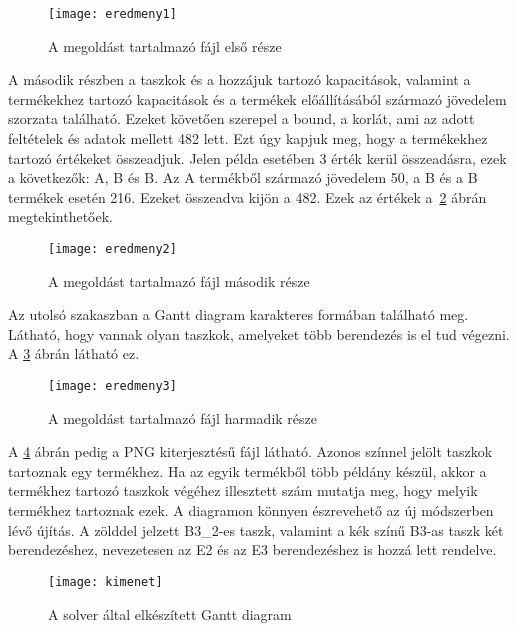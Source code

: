 \begin{figure}[H]
\begin{center}
\texttt{[image: eredmeny1]}
\caption{A megoldást tartalmazó fájl első része}
\label{eredmeny1}
\end{center}
\end{figure}

A második részben a taszkok és a hozzájuk tartozó kapacitások, valamint a termékekhez tartozó kapacitások és a termékek előállításából származó jövedelem szorzata található.
Ezeket követően szerepel a bound, a korlát, ami az adott feltételek és adatok mellett 482 lett.
Ezt úgy kapjuk meg, hogy a termékekhez tartozó értékeket összeadjuk.
Jelen példa esetében 3 érték kerül összeadásra, ezek a következők: A, B és B.
Az A termékből származó jövedelem 50, a B és a B termékek esetén 216.
Ezeket összeadva kijön a 482. Ezek az értékek a~\ref{eredmeny2} ábrán megtekinthetőek.

\begin{figure}[H]
\begin{center}
\texttt{[image: eredmeny2]}
\caption{A megoldást tartalmazó fájl második része}
\label{eredmeny2}
\end{center}
\end{figure}

Az utolsó szakaszban a Gantt diagram karakteres formában található meg.
Látható, hogy vannak olyan taszkok, amelyeket több berendezés is el tud végezni.
A \ref{eredmeny3} ábrán látható ez.

\begin{figure}[H]
\begin{center}
\texttt{[image: eredmeny3]}
\caption{A megoldást tartalmazó fájl harmadik része}
\label{eredmeny3}
\end{center}
\end{figure}

A \ref{kimenet} ábrán pedig a PNG kiterjesztésű fájl látható.
Azonos színnel jelölt taszkok tartoznak egy termékhez.
Ha az egyik termékből több példány készül, akkor a termékhez tartozó taszkok végéhez illesztett szám mutatja meg, hogy melyik termékhez tartoznak ezek.
A diagramon könnyen észrevehető az új módszerben lévő újítás.
A zölddel jelzett B3\_2-es taszk, valamint a kék színű B3-as taszk két berendezéshez, nevezetesen az E2 és az E3 berendezéshez is hozzá lett rendelve. 

\begin{figure}[H]
\begin{center}
\texttt{[image: kimenet]}
\caption{A solver által elkészített Gantt diagram}
\label{kimenet}
\end{center}
\end{figure}

